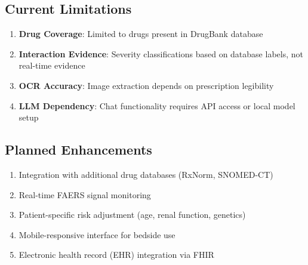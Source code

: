 \documentclass[11pt,a4paper]{article}
\begin{document}
\subsection{Current Limitations}

\begin{enumerate}
    \item \textbf{Drug Coverage}: Limited to drugs present in DrugBank database
    \item \textbf{Interaction Evidence}: Severity classifications based on database labels, not real-time evidence
    \item \textbf{OCR Accuracy}: Image extraction depends on prescription legibility
    \item \textbf{LLM Dependency}: Chat functionality requires API access or local model setup
\end{enumerate}

\subsection{Planned Enhancements}

\begin{enumerate}
    \item Integration with additional drug databases (RxNorm, SNOMED-CT)
    \item Real-time FAERS signal monitoring
    \item Patient-specific risk adjustment (age, renal function, genetics)
    \item Mobile-responsive interface for bedside use
    \item Electronic health record (EHR) integration via FHIR
\end{enumerate}
\end{document}
